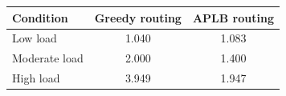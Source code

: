 \begin{tabular}{lcc}
\toprule
Condition & Greedy routing & APLB routing \\
\midrule
Low load & 1.040 & 1.083 \\
Moderate load & 2.000 & 1.400 \\
High load & 3.949 & 1.947 \\
\bottomrule
\end{tabular}
